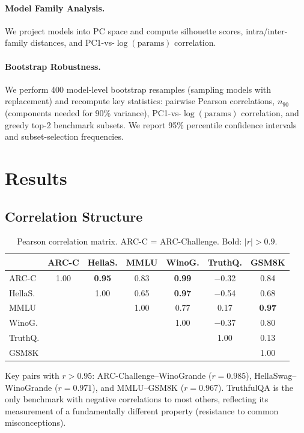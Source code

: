 \documentclass[11pt,a4paper]{article}
\begin{document}
\paragraph{Model Family Analysis.} We project models into PC space and compute silhouette scores, intra/inter-family distances, and PC1-vs-$\log(\text{params})$ correlation.

\paragraph{Bootstrap Robustness.} We perform 400 model-level bootstrap resamples (sampling models with replacement) and recompute key statistics: pairwise Pearson correlations, $n_{90}$ (components needed for 90\% variance), PC1-vs-$\log(\text{params})$ correlation, and greedy top-2 benchmark subsets. We report 95\% percentile confidence intervals and subset-selection frequencies.

\section{Results}

\subsection{Correlation Structure}

\begin{table}[h]
\centering
\caption{Pearson correlation matrix. ARC-C = ARC-Challenge. Bold: $|r| > 0.9$.}
\label{tab:corr}
\small
\begin{tabular}{lcccccc}
\toprule
 & ARC-C & HellaS. & MMLU & WinoG. & TruthQ. & GSM8K \\
\midrule
ARC-C     & 1.00  & \textbf{0.95} & 0.83  & \textbf{0.99} & $-$0.32 & 0.84 \\
HellaS.   &       & 1.00  & 0.65  & \textbf{0.97} & $-$0.54 & 0.68 \\
MMLU      &       &       & 1.00  & 0.77  &  0.17 & \textbf{0.97} \\
WinoG.    &       &       &       & 1.00  & $-$0.37 & 0.80 \\
TruthQ.   &       &       &       &       &  1.00 & 0.13 \\
GSM8K     &       &       &       &       &       & 1.00 \\
\bottomrule
\end{tabular}
\end{table}

Key pairs with $r > 0.95$: ARC-Challenge--WinoGrande ($r = 0.985$), HellaSwag--WinoGrande ($r = 0.971$), and MMLU--GSM8K ($r = 0.967$). TruthfulQA is the only benchmark with negative correlations to most others, reflecting its measurement of a fundamentally different property (resistance to common misconceptions).
\end{document}
